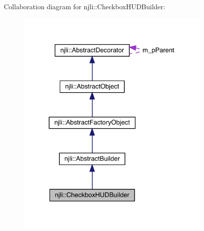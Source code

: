 Collaboration diagram for njli\+:\+:Checkbox\+H\+U\+D\+Builder\+:\nopagebreak
\begin{figure}[H]
\begin{center}
\leavevmode
\includegraphics[width=273pt]{classnjli_1_1_checkbox_h_u_d_builder__coll__graph}
\end{center}
\end{figure}
